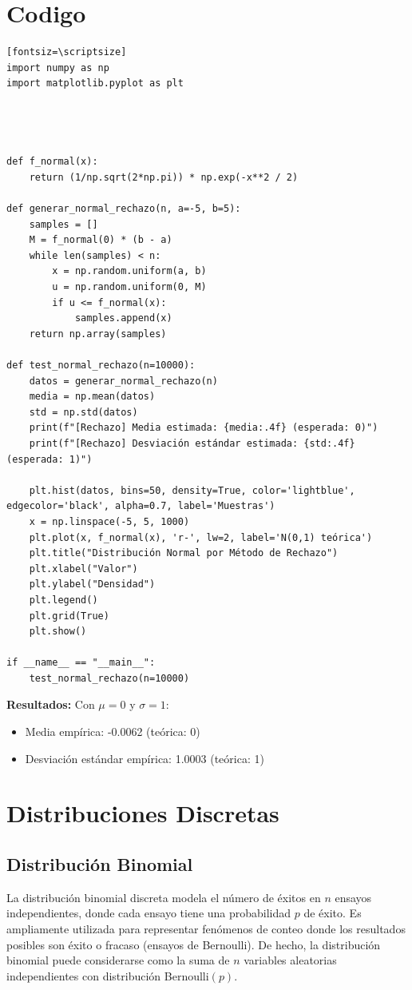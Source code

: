 \documentclass{article}
\begin{document}
\section{Codigo}
    \begin{verbatim}[fontsiz=\scriptsize]
import numpy as np
import matplotlib.pyplot as plt




def f_normal(x):
    return (1/np.sqrt(2*np.pi)) * np.exp(-x**2 / 2)

def generar_normal_rechazo(n, a=-5, b=5):
    samples = []
    M = f_normal(0) * (b - a)
    while len(samples) < n:
        x = np.random.uniform(a, b)
        u = np.random.uniform(0, M)
        if u <= f_normal(x):
            samples.append(x)
    return np.array(samples)

def test_normal_rechazo(n=10000):
    datos = generar_normal_rechazo(n)
    media = np.mean(datos)
    std = np.std(datos)
    print(f"[Rechazo] Media estimada: {media:.4f} (esperada: 0)")
    print(f"[Rechazo] Desviación estándar estimada: {std:.4f} (esperada: 1)")

    plt.hist(datos, bins=50, density=True, color='lightblue', edgecolor='black', alpha=0.7, label='Muestras')
    x = np.linspace(-5, 5, 1000)
    plt.plot(x, f_normal(x), 'r-', lw=2, label='N(0,1) teórica')
    plt.title("Distribución Normal por Método de Rechazo")
    plt.xlabel("Valor")
    plt.ylabel("Densidad")
    plt.legend()
    plt.grid(True)
    plt.show()

if __name__ == "__main__":
    test_normal_rechazo(n=10000)
    \end{verbatim}

\textbf{Resultados:} Con $\mu=0$ y $\sigma=1$:
\begin{itemize}
\item Media empírica: -0.0062 (teórica: 0)
\item Desviación estándar empírica: 1.0003 (teórica: 1)
\end{itemize}

\section{Distribuciones Discretas}

\subsection{Distribución Binomial}

La distribución binomial discreta modela el número de éxitos en $n$ ensayos independientes, donde cada ensayo tiene una probabilidad $p$ de éxito. Es ampliamente utilizada para representar fenómenos de conteo donde los resultados posibles son éxito o fracaso (ensayos de Bernoulli). De hecho, la distribución binomial puede considerarse como la suma de $n$ variables aleatorias independientes con distribución Bernoulli$(p)$.
\end{document}
